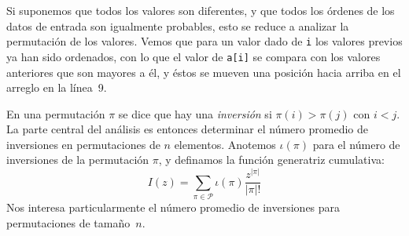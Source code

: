   Si suponemos que todos los valores son diferentes,
  y que todos los órdenes de los datos de entrada son igualmente probables,
  esto se reduce a analizar la permutación de los valores.
  Vemos que para un valor dado de \lstinline!i!
  los valores previos ya han sido ordenados,
  con lo que el valor de \lstinline!a[i]!
  se compara con los valores anteriores que son mayores a él,
  y éstos se mueven una posición hacia arriba en el arreglo
  en la línea~9.

  En una permutación \(\pi\) se dice que hay una \emph{inversión}%
  si \(\pi(i) > \pi(j)\) con \(i < j\).
  La parte central del análisis
  es entonces determinar el número promedio de inversiones
  en permutaciones de \(n\) elementos.
  Anotemos \(\iota(\pi)\) para el número de inversiones
  de la permutación \(\pi\),
  y definamos la función generatriz cumulativa:
  \begin{equation}
    \label{eq:I-def}
    I(z)
      = \sum_{\pi \in \mathcal{P}}
	  \iota(\pi) \frac{z^{\lvert \pi \rvert}}{\lvert \pi \rvert !}
  \end{equation}
  Nos interesa particularmente el número promedio de inversiones
  para permutaciones de tamaño~\(n\).

